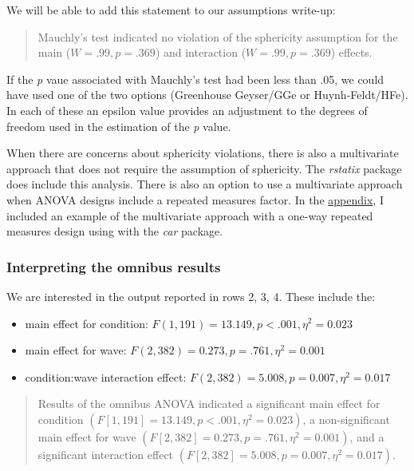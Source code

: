 \documentclass[
  11pt,
]{book}
\providecommand{\tightlist}{%
  \setlength{\itemsep}{0pt}\setlength{\parskip}{0pt}}
\begin{document}
We will be able to add this statement to our assumptions write-up:

\begin{quote}
Mauchly's test indicated no violation of the sphericity assumption for the main (\(W = .99, p = .369\)) and interaction (\(W = .99, p = .369\)) effects.
\end{quote}

If the \emph{p} vaue associated with Mauchly's test had been less than .05, we could have used one of the two options (Greenhouse Geyser/GGe or Huynh-Feldt/HFe). In each of these an epsilon value provides an adjustment to the degrees of freedom used in the estimation of the \emph{p} value.

When there are concerns about sphericity violations, there is also a multivariate approach that does not require the assumption of sphericity. The \emph{rstatix} package does include this analysis. There is also an option to use a multivariate approach when ANOVA designs include a repeated measures factor. In the \protect\hyperlink{RMmultiv}{appendix}, I included an example of the multivariate approach with a one-way repeated measures design using with the \emph{car} package.

\hypertarget{interpreting-the-omnibus-results}{%
\subsubsection{Interpreting the omnibus results}\label{interpreting-the-omnibus-results}}

We are interested in the output reported in rows 2, 3, 4. These include the:

\begin{itemize}
\tightlist
\item
  main effect for condition: \(F(1, 191) = 13.149, p < .001, \eta^{2} = 0.023\)
\item
  main effect for wave: \(F(2, 382) = 0.273, p = .761, \eta^{2} = 0.001\)
\item
  condition:wave interaction effect: \(F(2, 382) = 5.008, p = 0.007, \eta^{2} = 0.017\)
\end{itemize}

\begin{quote}
Results of the omnibus ANOVA indicated a significant main effect for condition \((F[1, 191] = 13.149, p < .001, \eta^{2} = 0.023)\), a non-significant main effect for wave \((F[2, 382] = 0.273, p = .761, \eta^{2} = 0.001)\), and a significant interaction effect \((F[2, 382] = 5.008, p = 0.007, \eta^{2} = 0.017)\).
\end{quote}
\end{document}
